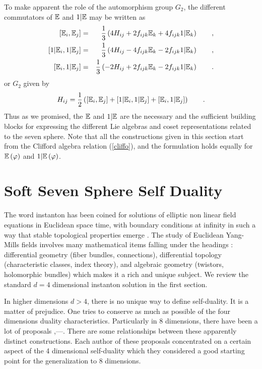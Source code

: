 \documentclass[a4paper,12pt]{book}
\begin{document}
To make apparent the role of the automorphism group $G_{2}$, the different
commutators of $\Bbb{E}$ and $1|\Bbb{E}$ may be written as 
\begin{eqnarray}
\left[ \Bbb{E}_{i},\Bbb{E}_{j}\right] &=&\frac{1}{3}\left( 4H_{ij}+2f_{ijk}%
\Bbb{E}_{k}+4f_{ijk}1|\Bbb{E}_{k}\right) \qquad , \\
\left[ 1|\Bbb{E}_{i},1|\Bbb{E}_{j}\right] &=&\frac{1}{3}\left(
4H_{ij}-4f_{ijk}\Bbb{E}_{k}-2f_{ijk}1|\Bbb{E}_{k}\right) \qquad , \\
\left[ \Bbb{E}_{i},1|\Bbb{E}_{j}\right] &=&\frac{1}{3}\left(
-2H_{ij}+2f_{ijk}\Bbb{E}_{k}-2f_{ijk}1|\Bbb{E}_{k}\right) \qquad .
\end{eqnarray}
or $G_{2}$ given by 
\begin{equation}
H_{ij}=\frac{1}{2}\left( [\Bbb{E}_{i},\Bbb{E}_{j}]+[1|\Bbb{E}_{i},1|\Bbb{E}%
_{j}]+[\Bbb{E}_{i},1|\Bbb{E}_{j}]\right) \qquad .
\end{equation}
Thus as we promised, the $\Bbb{E}$ and $1|\Bbb{E}$ are the necessary and the
sufficient building blocks for expressing the different Lie algebras and
coset representations related to the seven sphere. Note that all the
constructions given in this section start from the Clifford algebra relation
(\ref{cliffo}), and the formulation holds equally for $\Bbb{E}\left( \varphi
\right) $ and $1|\Bbb{E}\left( \varphi \right) $.

\chapter{Soft Seven Sphere Self Duality}

The word instanton has been coined for solutions of elliptic non linear
field equations in Euclidean space time, with boundary conditions at
infinity in such a way that stable topological properties emerge \cite{bpst}%
. The study of Euclidean Yang-Mills fields involves many mathematical items
falling under the headings : differential geometry (fiber bundles,
connections), differential topology (characteristic classes, index theory),
and algebraic geometry (twistors, holomorphic bundles) which makes it a rich
and unique subject. We review the standard $d=4$ dimensional instanton
solution in the first section.

In higher dimensions $d>4$, there is no unique way to define self-duality.
It is a matter of prejudice. One tries to conserve as much as possible of
the four dimensions duality characteristics. Particularly in 8 dimensions,
there have been a lot of proposals \cite{gks},\cite{wrd}---\cite{landi}.
There are some relationships between these apparently distinct
constructions. Each author of these proposals concentrated on a certain
aspect of the 4 dimensional self-duality which they considered a good
starting point for the generalization to 8 dimensions.
\end{document}
